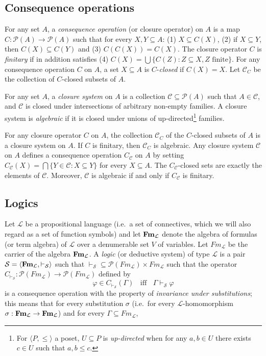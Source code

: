 \documentclass{llncs}
\numberwithin{equation}{section}
\newcommand{\LL}{\mathcal{L}}
\newcommand{\SSS}{\mathcal{S}}
\newcommand{\la}{\langle}
\newcommand{\ra}{\rangle}
\begin{document}
\subsection{Consequence operations}
For any set $A$, a \textit{consequence operation} (or closure operator) on $A$  is a map $C: \mathcal{P}(A) \to\mathcal{P}(A)$ such that for every $X, Y \subseteq A$: (1) $X \subseteq C(X)$, (2) if $X \subseteq Y $, then $C(X) \subseteq C(Y)$ and (3) $C(C(X)) = C(X)$. The closure operator $C$ is \textit{finitary} if in addition satisfies  (4) $C(X) = \bigcup\{C(Z): Z \subseteq X, Z \text{ finite}\}$. For any consequence operation $C$ on $A$, a set $X \subseteq A$ is $C$-\textit{closed} if $C(X) = X$. Let $\mathcal{C}_{C}$ be the collection of $C$-closed subsets of $A$.

For any set $A$, a \textit{closure system} on $A$ is a collection $\mathcal{C}\subseteq\mathcal{P}(A)$ such that $A\in \mathcal{C}$, and $\mathcal{C}$ is closed under intersections of arbitrary non-empty families. A closure system is \textit{algebraic} if it is closed under unions of up-directed\footnote{
For $\langle P,\leq\rangle$ a poset, $U\subseteq P$ is  \emph{up-directed} when for any $a,b\in U$ there exists $c\in U$ such that $a,b\leq c$. } families.

For any closure operator $C$ on $A$, the collection $\mathcal{C}_{C}$ of the $C$-closed subsets of $A$ is a closure system on $A$. If $C$ is finitary, then $\mathcal{C}_{C}$ is algebraic. Any closure system $\mathcal{C}$ on $A$ defines a consequence operation $C_{\mathcal{C}}$ on $A$ by setting
$C_{\mathcal{C}}(X) = \bigcap\{Y \in \mathcal{C}:X \subseteq Y\}$
for every $X \subseteq A$. The $C_{\mathcal{C}}$-closed sets are exactly the elements of $\mathcal{C}$. Moreover, $\mathcal{C}$ is algebraic if and only if $C_{\mathcal{C}}$ is finitary.

\subsection{Logics}\label{subsec:logics}
Let $\LL$ be a propositional language (i.e.\ a set of connectives, which we will also regard as a set  of function symbols) and let $\Fm_{\LL}$ denote the algebra of formulas (or term algebra) of $\LL$ over a denumerable  set $V$ of variables. Let $Fm_{\LL}$ be the carrier of the algebra $\Fm_{\LL}$. A \textit{logic} (or deductive system) of type $\LL$ is a pair $\SSS = \la \Fm_{\LL}, \vdash_{\SSS}\ra$ such that $\vdash_{\SSS}\subseteq\mathcal{P}(Fm_{\LL})\times Fm_{\LL}$ such that the operator $C_{\vdash_{\SSS}}:\mathcal{P}(Fm_{\LL}) \to \mathcal{P}(Fm_{\LL})$ defined by $$\varphi \in C_{\vdash_{\SSS}}(\Gamma)\; \; \text{ iff } \; \; \Gamma \vdash_{\SSS} \varphi$$ is a consequence operation with the property of  \textit{invariance under substitutions}; this means that for every substitution $\sigma$ (i.e.\ for every $\LL$-homomorphism $\sigma: \Fm_{\LL}\rightarrow\Fm_{\LL}$) and for every $\Gamma \subseteq Fm_{\LL}$,
\end{document}
